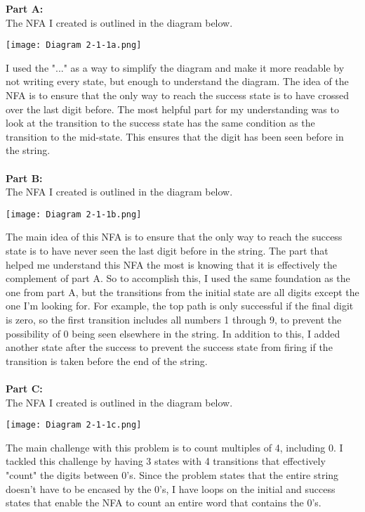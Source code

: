 \documentclass{article}
\theoremstyle{theorem}
\theoremstyle{definition}
\theoremstyle{remark}
\begin{document}
\textbf{Part A:}\\
The NFA I created is outlined in the diagram below.
\begin{center}
    \texttt{[image: Diagram 2-1-1a.png]}
\end{center}
I used the "..." as a way to simplify the diagram and make it more readable by not writing every state, but enough to understand the diagram. 
The idea of the NFA is to ensure that the only way to reach the success state is to have crossed over the last digit before. 
The most helpful part for my understanding was to look at the transition to the success state has the same condition as the transition to the mid-state. 
This ensures that the digit has been seen before in the string.\\
\\
\textbf{Part B:}\\
The NFA I created is outlined in the diagram below.
\begin{center}
    \texttt{[image: Diagram 2-1-1b.png]}
\end{center}
The main idea of this NFA is to ensure that the only way to reach the success state is to have never seen the last digit before in the string.
The part that helped me understand this NFA the most is knowing that it is effectively the complement of part A. 
So to accomplish this, I used the same foundation as the one from part A, but the transitions from the initial state are all digits except the one I'm looking for. For example, the top path is only successful if the final digit is zero, so the first transition includes all numbers 1 through 9, to prevent the possibility of 0 being seen elsewhere in the string. In addition to this, I added another state after the success to prevent the success state from firing if the transition is taken before the end of the string.\\
\\
\textbf{Part C:}\\
The NFA I created is outlined in the diagram below.
\begin{center}
    \texttt{[image: Diagram 2-1-1c.png]}
\end{center}
The main challenge with this problem is to count multiples of 4, including 0. 
I tackled this challenge by having 3 states with 4 transitions that effectively "count" the digits between 0's.
Since the problem states that the entire string doesn't have to be encased by the 0's, I have loops on the initial and success states that enable the NFA to count an entire word that contains the 0's.\\
\end{document}
